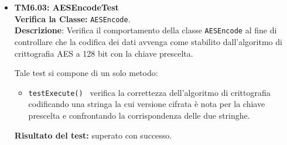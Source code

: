\begin{itemize}
\item \textbf{TM6.03: AESEncodeTest}\\
\textbf{Verifica la Classe:} \texttt{AESEncode}.\\
\textbf{Descrizione}: Verifica il comportamento della classe \texttt{AESEncode} al fine di controllare che la codifica dei dati avvenga come stabilito dall'algoritmo di crittografia AES a 128 bit con la chiave prescelta.

Tale test si compone di un solo metodo:
\begin{itemize}
\item \texttt{testExecute() } verifica la correttezza dell'algoritmo di crittografia codificando una stringa la cui versione cifrata è nota per la chiave prescelta e confrontando la corrispondenza delle due stringhe.
\end{itemize}
\textbf{Risultato del test:} superato con successo.

\end{itemize}


